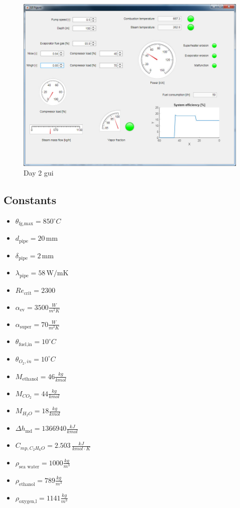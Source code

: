 \documentclass[openany]{book}
\begin{document}
	
	\begin{figure}[h!]
		\centering
		\includegraphics[width=\textwidth]{gui2}
		\caption{Day 2 gui}
		\label{fig:gui2}
	\end{figure}
	
	
	\subsection{Constants} \label{sec:const}
	
	\begin{itemize}
		\item $\theta_\textrm{fg,max} = 850 ^\circ C$
		\item $d_\textrm{pipe} = 20 \,\textrm{mm}$
		\item $\delta_\textrm{pipe} = 2 \,\textrm{mm}$
		\item $\lambda_\textrm{pipe}  = 58 \,\textrm{W/mK}$
		\item $Re_\textrm{crit} = 2300$
		\item $\alpha_\textrm{ev} = 3500 \frac{W}{m^2K}$
		\item $\alpha_\textrm{super} = 70 \frac{W}{m^2K}$
		\item $\theta_\textrm{fuel,in} = 10 ^\circ C$
		\item $\theta_{O_2,in} = 10 ^\circ C$
		\item $M_\textrm{ethanol} = 46 \frac{kg}{kmol}$
		\item $M_{CO_2} = 44 \frac{kg}{kmol}$
		\item $M_{H_2O} = 18 \frac{kg}{kmol}$
		\item $\Delta h_\textrm{md} = 1366940 \frac{kJ}{kmol}$
		\item $C_{mp,C_2H_6O} = 2.503 \,\frac{kJ}{kmol \cdot K}$
		\item $\rho_\textrm{sea\ water} = 1000 \frac{kg}{m^3}$
		\item $\rho_\textrm{ethanol} = 789 \frac{kg}{m^3}$
		\item $\rho_\textrm{oxygen,l} = 1141 \frac{kg}{m^3}$
	\end{itemize}
	
\end{document}
